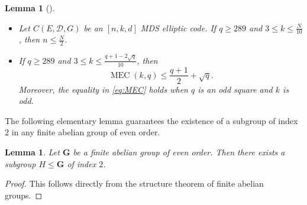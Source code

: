 \documentclass[journal,12pt,onecolumn]{IEEEtran}
\newtheorem{lemma}[theorem]{Lemma}
\DeclareMathOperator{\ord}{ord} %
\begin{document}
\begin{lemma}[\cite{MR4564628}]\label{lem:a_tight_upper_bound_before}
\begin{itemize}
    \item[(i)] Let $C(E, \mathcal{D}, G)$ be an $[n, k, d]$ MDS elliptic code. If $q \ge 289$ and $3 \le k \le \frac{N}{10}$, then $n \le \frac{N}{2}$.
    \item[(ii)] If $q \ge 289$ and $3 \le k \le \frac{q+1-2\sqrt{q}}{10}$, then
    \begin{equation} \label{eq:MEC}
        \operatorname{MEC}(k, q) \le \frac{q+1}{2} + \sqrt{q}.
    \end{equation}
    Moreover, the equality in \eqref{eq:MEC} holds when  $q$ is an odd square and $k$ is odd.
\end{itemize}
\end{lemma}

The following elementary lemma guarantees the existence of a subgroup of index $2$ in any finite abelian group of even order.

\begin{lemma}\label{lem:the_existence_of_index_two_subgroup}
Let $\mathbf{G}$ be a finite abelian group of even order. Then there exists a subgroup $H \le \mathbf{G}$ of index $2$.
\end{lemma}
\begin{proof}
This follows directly from the structure theorem of finite abelian groups.



\end{proof}
\end{document}

